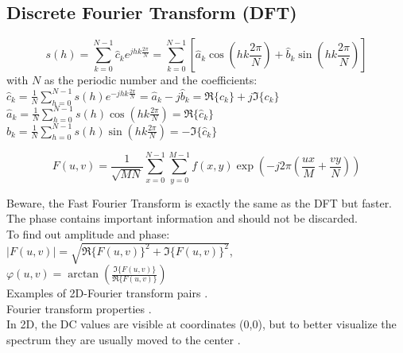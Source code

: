 
\subsection{Discrete Fourier Transform (DFT)}
\begin{minipage}{11cm}
   $$s(h)=\sum_{k=0}^{N-1}\hat c_k e^{jhk\frac{2\pi}{N}}=
     \sum_{k=0}^{N-1} \left[ \hat{a}_k \cos\left(hk \frac{2 \pi}{N}\right)+\hat{b}_k \sin\left(hk
    \frac{2 \pi}{N}\right) \right]$$ with $N$ as the periodic number and the coefficients:\\
    $\hat{c}_k=\frac{1}{N} \sum\limits_{h=0}^{N-1}s(h) e^{-jhk\frac{2\pi}{N}}=\hat{a}_k-j\hat{b}_k = \Re\{c_k\} + j \Im\{c_k\}$ \\
    $\hat{a}_k=\frac{1}{N} \sum\limits_{h=0}^{N-1}s(h) \cos\left(hk \frac{2 \pi}{N}\right)=\Re\{\hat{c}_k\}$ \\
    $\hat{b}_k=\frac{1}{N} \sum\limits_{h=0}^{N-1}s(h) \sin\left(hk \frac{2 \pi}{N}\right)=-\Im\{\hat{c}_k\}$ 
  
    $$F(u,v) = \frac{1}{\sqrt{M N}} \sum_{x=0}^{N-1} \sum_{y=0}^{M-1} f(x,y) \exp\left( -j 2 \pi \left(\frac{ux}{M} + \frac{v y}{N} \right) \right)$$
\end{minipage}
\begin{minipage}{8cm}
  Beware, the Fast Fourier Transform is exactly the same as the DFT but faster.
  The phase contains important information and should not be discarded.\\
  
  To find out amplitude and phase:\\
  $|F(u,v)| = \sqrt{\Re\{F(u,v)\}^2 + \Im \{F(u,v)\}^2}$,\\
  $\varphi(u,v) = \arctan\left( \frac{\Im \{F(u,v)\}}{\Re\{F(u,v)\}} \right)$\\
  
  Examples of 2D-Fourier transform pairs .\\
  Fourier transform properties .\\
  
  In 2D, the DC values are visible at coordinates (0,0), but to better visualize the spectrum they 
  are usually moved to the center .  
\end{minipage}

